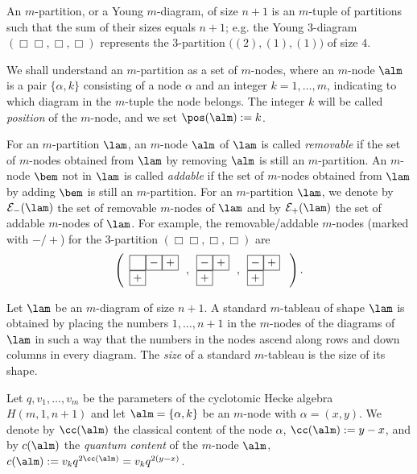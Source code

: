 An $m$-partition, or a Young $m$-diagram, of size $n+1$ is an $m$-tuple of partitions such that the sum of their sizes equals $n+1$;  e.g.
the Young $3$-diagram $\left(\Box\!\Box,\Box,\Box\right)$ represents the $3$-partition $\bigl((2),(1),(1)\bigr)$ of size $4$.


We shall understand an $m$-partition as a set of $m$-nodes, where an $m$-node $\alm$ is a pair
$\{\alpha,k\}$ consisting of a node $\alpha$ and an integer $k=1,\dots,m$, indicating to which diagram in the $m$-tuple the node belongs. The integer $k$ will be called {\it position}
of the $m$-node, and we set $\pos(\alm):=k$.



For an $m$-partition $\lam$, an $m$-node $\alm$ of $\lam$ is called {\it removable} if the set of $m$-nodes obtained from $\lam$ by removing $\alm$ is still an $m$-partition. An $m$-node $\bem$ not in $\lam$ is called {\it  addable} if the set of $m$-nodes obtained from $\lam$ by adding $\bem$ is still an $m$-partition. For an $m$-partition $\lam$, we denote by
${\cal{E}}_-(\lam)$ the set of removable $m$-nodes of $\lam$ and by ${\cal{E}}_+(\lam)$ the set of addable $m$-nodes of
$\lam$.
For example, the removable/addable $m$-nodes (marked with $-/+$) for the $3$-partition $\left(\Box\!\Box,\Box,\Box\right)$
are
\[
\left(\begin{array}{l}\fbox{$\phantom{-}$}\fbox{$-$}\fbox{$+$}\\ \fbox{$+$}\end{array}
\, ,\begin{array}{l}\fbox{$-$}\fbox{$+$}\\ \fbox{$+$}\end{array}\, ,\begin{array}{l}\fbox{$-$}\fbox{$+$}\\ \fbox{$+$}\end{array}\ \right).
\]


Let $\lam$ be an $m$-diagram of size $n+1$. A standard $m$-tableau of shape $\lam$ is obtained by placing the numbers $1,\dots,n+1$ in the $m$-nodes of the diagrams of $\lam$ in such a way that the numbers in the nodes ascend along rows and down columns in every diagram.
The \emph{size} of a standard $m$-tableau is the size of its shape.


Let $q,v_1,\dots,v_m$ be the parameters of the cyclotomic Hecke algebra $H(m,1,n+1)$ and let $\alm=\{\alpha,k\}$
be an $m$-node with $\alpha=(x,y)$.
We denote by $\cc(\alm)$ the classical content of the node $\alpha$, $\cc(\alm):=y-x$, and by $c(\alm)$ the {\it quantum content} of the $m$-node $\alm$,  $c(\alm):=v_kq^{2\cc(\alm)}=v_kq^{2(y-x)}$.

